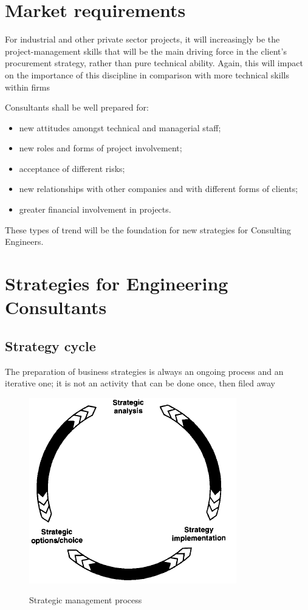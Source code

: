 \documentclass[a4paper,twoside,11pt]{article}
\begin{document}
\section{Market requirements}

\epigraph{For industrial and other private sector projects, it will increasingly be the project-management skills that will be the main driving force in the client's procurement strategy, rather than pure technical ability. Again, this will impact on the importance of this discipline in comparison with more technical skills within firms }{}

Consultants shall be well prepared for:

\begin{itemize}
\item new attitudes amongst technical and managerial staff;
\item new roles and forms of project involvement;
\item acceptance of different risks;
\item new relationships with other companies and with different forms of clients;
\item greater financial involvement in projects.
\end{itemize}

These types of trend will be the foundation for new strategies for Consulting Engineers.


\section{Strategies for Engineering Consultants}
\subsection{Strategy cycle}


\epigraph{The preparation of business strategies is always an ongoing process and an iterative one; it is not an activity that can be done once, then filed away}{}

\begin{figure}[!htb]
	\includegraphics[scale=2]{figures/strategicmanagementprocess} \\
	\caption{Strategic management process}
	\label{strategicmanagementprocess} 
\end{figure}
\end{document}
